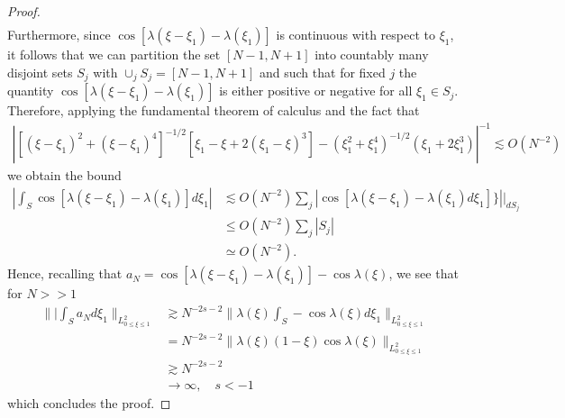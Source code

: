 \documentclass[12pt,reqno]{amsart}
\numberwithin{equation}{section}  %
\begin{document}
\begin{proof}
\begin{equation*}
\begin{split}
\end{split}
\end{equation*}
%
%
Furthermore, since $\cos[\lambda(\xi - \xi_{1}) - \lambda(\xi_{1})]$ is continuous with respect to $\xi_{1}$, it follows that we can partition the set $[N-1, N+1]$ into countably many disjoint sets $S_{j}$ with $\cup_{j} S_{j} = [N-1, N+1]$ and such that for fixed $j$ the quantity $\cos[\lambda(\xi - \xi_{1}) - \lambda(\xi_{1})]$ is either positive or negative for all $\xi_{1} \in S_{j}$. Therefore, applying the fundamental theorem of calculus and the fact that
%
%
\begin{equation*}
\begin{split}
  \left | [(\xi - \xi_{1})^{2} + (\xi - \xi_{1})^{4}]^{-1/2}[\xi_{1} - \xi + 2(\xi_{1} - \xi)^{3}] - (\xi_{1}^{2} + \xi_{1}^{4})^{-1/2} (\xi_{1} + 2 \xi_{1}^{3}) \right | ^{-1} \lesssim O(N^{-2}) 
\end{split}
\end{equation*}
%
%
we obtain the bound
%
%
\begin{equation*}
\begin{split}
  | \int_{S} \cos[\lambda(\xi - \xi_{1}) - \lambda(\xi_{1})] d \xi_{1} |
   & \lesssim O(N^{-2}) \sum_{j} \left | \cos[\lambda(\xi - \xi_{1}) - \lambda(\xi_{1}) d \xi_{1}] \} \right | \bigg |_{dS_{j}}
  \\
  & \le O(N^{-2}) \sum_{j} | S_{j} |
  \\
  & \simeq O(N^{-2}).
\end{split}
\end{equation*}
%
%
Hence, recalling that $a_{N} =   \cos[\lambda(\xi - \xi_{1}) - \lambda(\xi_{1})] - \cos \lambda(\xi)$, we see that for $N >>1$
%
%
\begin{equation*}
\begin{split}
\| | \int_{S}a_{N} d \xi_{1} \|_{L^{2}_{0 \le \xi \le 1}}
& \gtrsim N^{-2s -2}\| \lambda(\xi) \int_{S} -\cos \lambda(\xi) d \xi_{1} \|_{L^{2}_{0 \le \xi \le 1}}
\\
& = N^{-2s-2} \| \lambda(\xi) (1-\xi) \cos \lambda(\xi) \|_{L^{2}_{0 \le \xi \le 1}}
\\
& \gtrsim N^{-2s-2}
\\
& \to \infty, \quad s < -1
\end{split}
\end{equation*}
%
%
which concludes the proof.
\end{proof}
%
%
%
%
%
%
%
%
%
%
%
%
%
%
%
\end{document}
